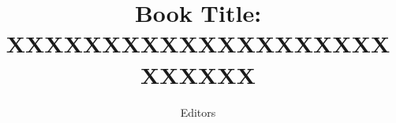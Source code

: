 \def\CTeXPreproc{Created by ctex v0.2.12, don't edit!}\documentclass{book}
\begin{document}
\title{Book Title: XXXXXXXXXXXXXXXXXXXXXXXXXX}
\author{Editors}


\maketitle

\doublespace \frontmatter \tableofcontents \mainmatter
{}



%

%
%
\end{document}
